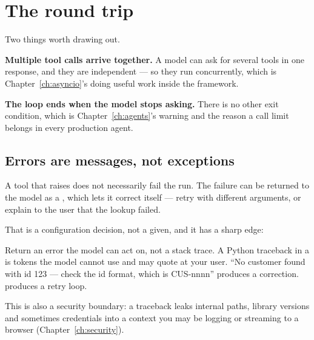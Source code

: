 \section{The round trip}
\label{sec:tool-round-trip}


Two things worth drawing out.

\textbf{Multiple tool calls arrive together.} A model can ask for several tools
in one response, and they are independent --- so they run concurrently, which is
Chapter~\ref{ch:asyncio}'s  doing useful work inside the framework.

\textbf{The loop ends when the model stops asking.} There is no other exit
condition, which is Chapter~\ref{ch:agents}'s warning and the reason a call limit
belongs in every production agent.

\subsection{Errors are messages, not exceptions}
\label{sec:tool-errors}

A tool that raises does not necessarily fail the run. The failure can be returned
to the model as a , which lets it correct itself --- retry with
different arguments, or explain to the user that the lookup failed.

That is a configuration decision, not a given, and it has a sharp edge:

\begin{warning}
Return an error the model can act on, not a stack trace. A Python traceback in a
 is tokens the model cannot use and may quote at your user.
``No customer found with id 123 --- check the id format, which is CUS-nnnn''
produces a correction.  produces a retry loop.

This is also a security boundary: a traceback leaks internal paths, library
versions and sometimes credentials into a context you may be logging or
streaming to a browser (Chapter~\ref{ch:security}).
\end{warning}

